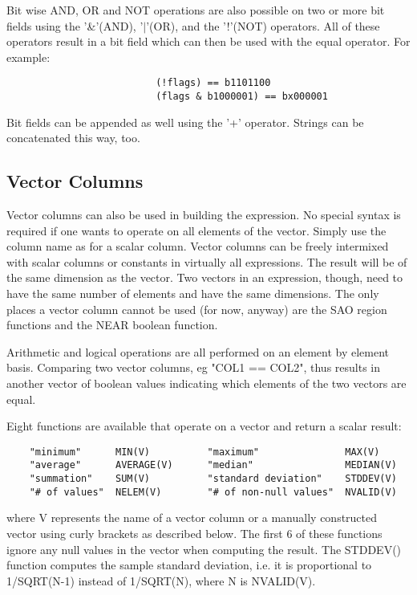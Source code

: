 \documentclass[11pt]{book}
\begin{document}
    Bit wise AND, OR and NOT operations are  also  possible  on  two  or
    more  bit  fields  using  the  '\&'(AND),  '$|$'(OR),  and the '!'(NOT)
    operators. All of these operators result in a bit  field  which  can
    then be used with the equal operator. For example:


\begin{verbatim}
                          (!flags) == b1101100
                          (flags & b1000001) == bx000001
\end{verbatim}

    Bit  fields can be appended as well using the '+' operator.  Strings
    can be concatenated this way, too.


\subsection{Vector Columns}

    Vector columns can also be used  in  building  the  expression.   No
    special  syntax  is required if one wants to operate on all elements
    of the vector.  Simply use the column name as for a  scalar  column.
    Vector  columns  can  be  freely  intermixed  with scalar columns or
    constants in virtually all expressions.  The result will be  of  the
    same dimension as the vector.  Two vectors in an expression, though,
    need to  have  the  same  number  of  elements  and  have  the  same
    dimensions.   The  only  places  a vector column cannot be used (for
    now, anyway) are the SAO  region  functions  and  the  NEAR  boolean
    function.

    Arithmetic and logical operations are all performed on an element by
    element basis.  Comparing two vector columns,  eg  "COL1  ==  COL2",
    thus  results  in  another vector of boolean values indicating which
    elements of the two vectors are equal.

    Eight functions are available that operate on a vector and return a
    scalar result:

\begin{verbatim}
    "minimum"      MIN(V)          "maximum"               MAX(V)
    "average"      AVERAGE(V)      "median"                MEDIAN(V)
    "summation"    SUM(V)          "standard deviation"    STDDEV(V)
    "# of values"  NELEM(V)        "# of non-null values"  NVALID(V)
\end{verbatim}
    where V represents the name of a vector column or a manually
    constructed vector using curly brackets as described below.  The
    first 6 of these functions ignore any null values in the vector when
    computing the result.  The STDDEV() function computes the sample
    standard deviation, i.e. it is proportional to 1/SQRT(N-1) instead
    of 1/SQRT(N), where N is NVALID(V).
\end{document}
